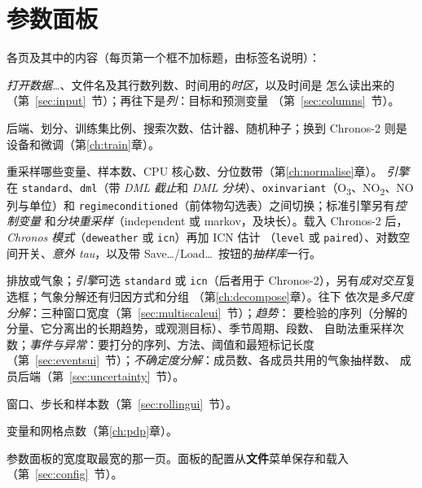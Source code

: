 \documentclass[11pt]{ctexrep}
\newcommand{\nosep}{\setlength{\itemsep}{0pt}\setlength{\parskip}{0pt}\setlength{\topsep}{2pt}}
\newcommand{\codeunderscore}{\textunderscore\allowbreak}
\newcommand{\code}[1]{\texttt{\let\_\codeunderscore #1}}
\newcommand{\tab}[1]{\textbf{#1}}
\newcommand{\NOtwo}{NO\textsubscript{2}}
\begin{document}
\section{参数面板}
各页及其中的内容（每页第一个框不加标题，由标签名说明）：
\begin{description}\nosep
  \item[数据] \emph{打开数据…}、文件名及其行数列数、时间用的\emph{时区}，以及时间是
        怎么读出来的（第~\ref{sec:input}~节）；再往下是\emph{列}：目标和预测变量
        （第~\ref{sec:columns}~节）。
  \item[模型] 后端、划分、训练集比例、搜索次数、估计器、随机种子；换到
        Chronos-2 则是设备和微调（第\ref{ch:train}章）。
  \item[归一化] 重采样哪些变量、样本数、CPU 核心数、分位数带（第\ref{ch:normalise}章）。
        \emph{引擎}在 \code{standard}、\code{dml}（带 \emph{DML 截止}和 \emph{DML
        分块}）、\code{ox\_invariant}（O\textsubscript{3}、\NOtwo{}、NO 列与单位）和
        \code{regime\_conditioned}（前体物勾选表）之间切换；标准引擎另有\emph{控制变量}
        和\emph{分块重采样}（independent 或 markov，及块长）。载入 Chronos-2 后，
        \emph{Chronos 模式}（\code{deweather} 或 \code{icn}）再加 ICN 估计
        （\code{level} 或 \code{paired}）、对数空间开关、\emph{意外 tau}，以及带
        Save\dots/Load\dots\ 按钮的\emph{抽样库}一行。
  \item[分解] 排放或气象；\emph{引擎}可选 \code{standard} 或 \code{icn}（后者用于
        Chronos-2），另有\emph{成对交互}复选框；气象分解还有归因方式和分组
        （第\ref{ch:decompose}章）。往下
        依次是\emph{多尺度分解}：三种窗口宽度（第~\ref{sec:multiscaleui}~节）；\emph{趋势}：
        要检验的序列（分解的分量、它分离出的长期趋势，或观测目标）、季节周期、段数、
        自助法重采样次数；\emph{事件与异常}：要打分的序列、方法、阈值和最短标记长度
        （第~\ref{sec:eventsui}~节）；\emph{不确定度分解}：成员数、各成员共用的气象抽样数、
        成员后端（第~\ref{sec:uncertainty}~节）。
  \item[滚动] 窗口、步长和样本数（第~\ref{sec:rollingui}~节）。
  \item[PDP] 变量和网格点数（第\ref{ch:pdp}章）。
\end{description}
参数面板的宽度取最宽的那一页。面板的配置从\tab{文件}菜单保存和载入
（第~\ref{sec:config}~节）。
\end{document}
